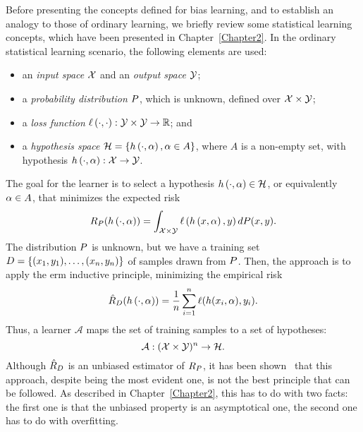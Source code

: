 Before presenting the concepts defined for bias learning, and to establish an analogy to those of ordinary learning, we briefly review some statistical learning concepts, which have been presented in Chapter~\ref{Chapter2}.
In the ordinary statistical learning scenario, the following elements are used:
\begin{itemize}
    \item an \emph{input space} $\mathcal{X}$ and an \emph{output space} $\mathcal{Y}$;
    \item a \emph{probability distribution} $P$, which is unknown, defined over $\mathcal{X} \times \mathcal{Y}$;
    \item a \emph{loss function} $\ell\left( \cdot, \cdot\right):\mathcal{Y} \times \mathcal{Y} \to \mathbb{R}$; and
    \item a \emph{hypothesis space} $\mathcal{H} = \left\{h\left(\cdot, \alpha\right), \alpha \in A\right\}$, where $A$ is a non-empty set, with hypothesis $h\left(\cdot, \alpha\right): \mathcal{X} \to \mathcal{Y}$.
\end{itemize}
The goal for the learner is to select a hypothesis $h\left(\cdot, \alpha\right) \in \mathcal{H}$, or equivalently $\alpha \in A$, that minimizes the expected risk
$$ R_P(h\left(\cdot, \alpha\right)) =  \int_{\mathcal{X} \times \mathcal{Y}} \ell\left( h\left(x, \alpha\right), y\right) dP(x, y) .$$
The distribution $P$ is unknown, but we have a training set $D = \{(x_1, y_1), \ldots, (x_n, y_n)\}$ of samples drawn from $P$. 
Then, the approach is to apply the \acrshort{erm} inductive principle, minimizing the empirical risk
$$ \hat{R}_{D}(h\left(\cdot, \alpha\right)) = \frac{1}{n} \sum_{i=1}^n \ell(h(x_i, \alpha), y_i).$$
Thus, a learner $\mathcal{A}$ maps the set of training samples to a set of hypotheses:
\begin{equation}
    \nonumber
    \mathcal{A} : {(\mathcal{X} \times \mathcal{Y})^n} \to \mathcal{H}.
\end{equation}
Although $\hat{R}_{D}$ is an unbiased estimator of $R_P$, it has been shown~\citep{Vapnik00} that this approach, despite being the most evident one, is not the best principle that can be followed.
As described in Chapter~\ref{Chapter2}, this has to do with two facts: the first one is that the unbiased property is an asymptotical one, the second one has to do with overfitting.
